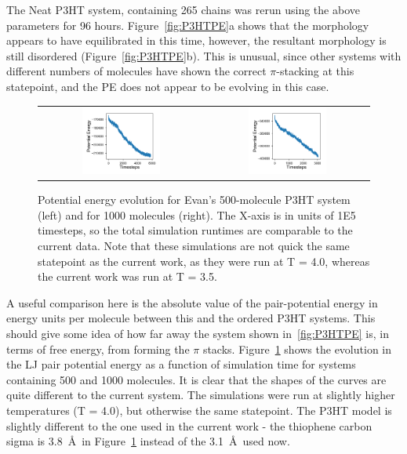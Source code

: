 \documentclass[12pt]{article}
\begin{document}
The Neat P3HT system, containing 265 chains was rerun using the above parameters for 96 hours.
Figure~\ref{fig:P3HTPE}a shows that the morphology appears to have equilibrated in this time, however, the resultant morphology is still disordered (Figure~\ref{fig:P3HTPE}b).
This is unusual, since other systems with different numbers of molecules have shown the correct $\pi$-stacking at this statepoint, and the PE does not appear to be evolving in this case.


\begin{figure}[h!]\centering
    \begin{tabular}{cc}
        \includegraphics[width=0.5\textwidth]{Figures/P3HT500.pdf}&
	    \includegraphics[width=0.5\textwidth]{Figures/P3HT1000.pdf}
    \end{tabular}
    \caption{Potential energy evolution for Evan's 500-molecule P3HT system (left) and for 1000 molecules (right).
    The X-axis is in units of 1E5 timesteps, so the total simulation runtimes are comparable to the current data.
    Note that these simulations are not quick the same statepoint as the current work, as they were run at T = 4.0, whereas the current work was run at T = 3.5.}
	\label{fig:P3HTPEs}
\end{figure}


A useful comparison here is the absolute value of the pair-potential energy in energy units per molecule between this and the ordered P3HT systems.
This should give some idea of how far away the system shown in~\ref{fig:P3HTPE} is, in terms of free energy, from forming the $\pi$ stacks.
Figure~\ref{fig:P3HTPEs} shows the evolution in the LJ pair potential energy as a function of simulation time for systems containing 500 and 1000 molecules.
It is clear that the shapes of the curves are quite different to the current system.
The simulations were run at slightly higher temperatures (T = 4.0), but otherwise the same statepoint.
The P3HT model is slightly different to the one used in the current work - the thiophene carbon sigma is 3.8~\AA~in Figure~\ref{fig:P3HTPEs} instead of the 3.1~\AA~used now.
\end{document}
